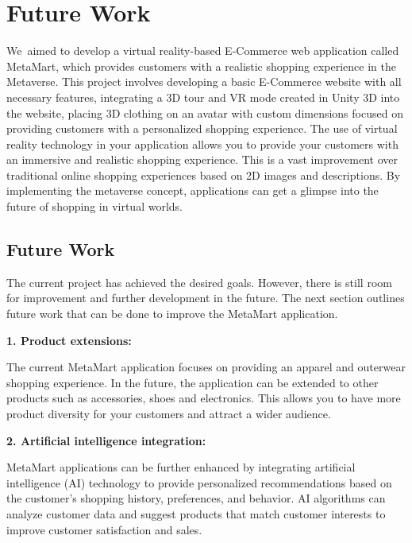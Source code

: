 \newpage
\begingroup%
\makeatletter%
\let\clearpage\relax%
\vspace*{\fill}%
\vspace*{\dimexpr-50\p@-\baselineskip}%
\chapterfont{\centering}
\chapter{Future Work}
\vspace*{\fill}%
\endgroup

\newpage
\label{Chapter6}
We aimed to develop a virtual reality-based E-Commerce web application called MetaMart, which provides customers with a realistic shopping experience in the Metaverse. This project involves developing a basic E-Commerce website with all necessary features, integrating a 3D tour and VR mode created in Unity 3D into the website, placing 3D clothing on an avatar with custom dimensions focused on providing customers with a personalized shopping experience.
The use of virtual reality technology in your application allows you to provide your customers with an immersive and realistic shopping experience. This is a vast improvement over traditional online shopping experiences based on 2D images and descriptions. By implementing the metaverse concept, applications can get a glimpse into the future of shopping in virtual worlds. 
\section{Future Work}
The current project has achieved the desired goals. However, there is still room for improvement and further development in the future. The next section outlines future work that can be done to improve the MetaMart application.

\textbf{1. Product extensions:}

The current MetaMart application focuses on providing an apparel and outerwear shopping experience. In the future, the application can be extended to other products such as accessories, shoes and electronics. This allows you to have more product diversity for your customers and attract a wider audience.

\textbf{2. Artificial intelligence integration:}

MetaMart applications can be further enhanced by integrating artificial intelligence (AI) technology to provide personalized recommendations based on the customer's shopping history, preferences, and behavior. AI algorithms can analyze customer data and suggest products that match customer interests to improve customer satisfaction and sales.

